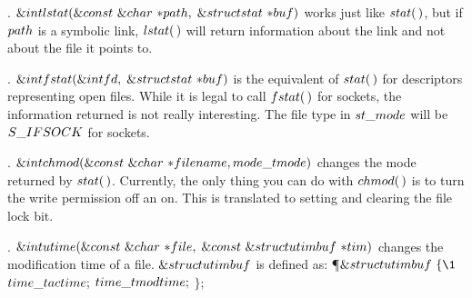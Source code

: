 \fi

. \CD{}$\&{int}\ \\{lstat}(\&{const}\ \&{char}\ {*}\\{path},\;\&{struct}\ %
\\{stat}\ {*}\\{buf})$\DC{} works just like \CD{}$\\{stat}(\,)$\DC{}, but if %
\CD{}$\\{path}$\DC{}
is a symbolic link, \CD{}$\\{lstat}(\,)$\DC{} will return information about the
link and not about
the file it points to.

\fi

. \CD{}$\&{int}\ \\{fstat}(\&{int}\ \\{fd},\;\&{struct}\ \\{stat}\ {*}%
\\{buf})$\DC{} is the equivalent of \CD{}$\\{stat}(\,)$\DC{} for descriptors
representing open files. While it is legal to call \CD{}$\\{fstat}(\,)$\DC{}
for sockets, the
information returned is not really interesting. The file type in \CD{}$\\{st%
\_mode}$\DC{} will be
\CD{}$\\{S\_IFSOCK}$\DC{} for sockets.

\fi

. \CD{}$\&{int}\ \\{chmod}(\&{const}\ \&{char}\ {*}\\{filename},\;\\{mode%
\_t}\ \\{mode})$\DC{} changes the mode returned by \CD{}$\\{stat}(\,)$\DC{}.
Currently,
the only thing you can do with \CD{}$\\{chmod}(\,)$\DC{} is to turn the write
permission off an on. This
is translated to setting and clearing the file lock bit.

\fi

. \CD{}$\&{int}\ \\{utime}(\&{const}\ \&{char}\ {*}\\{file},\;\&{const}\ %
\&{struct}\ \\{utimbuf}\ {*}\\{tim})$\DC{} changes the modification time
of a file. \CD{}$\&{struct}\ \\{utimbuf}$\DC{} is defined as:
\Y\P $\&{struct}\ \\{utimbuf}\ \{\1$\6
$\\{time\_t}\ \\{actime};$\5
\6
$\\{time\_t}\ \\{modtime};$\5
\2\6
$\};$\par
\fi

